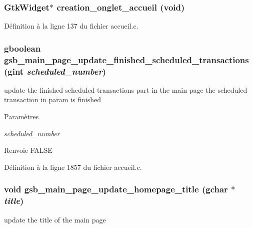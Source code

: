 \subsubsection[{creation\_\-onglet\_\-accueil}]{\setlength{\rightskip}{0pt plus 5cm}GtkWidget$\ast$ creation\_\-onglet\_\-accueil (void)}\label{accueil_8c_a31cb1d27d08c170361e63a0a7ef4ddb0}


Définition à la ligne 137 du fichier accueil.c.

\subsubsection[{gsb\_\-main\_\-page\_\-update\_\-finished\_\-scheduled\_\-transactions}]{\setlength{\rightskip}{0pt plus 5cm}gboolean gsb\_\-main\_\-page\_\-update\_\-finished\_\-scheduled\_\-transactions (gint {\em scheduled\_\-number})}\label{accueil_8c_a3b20e859b5870632529db167d03decfa}
update the finished scheduled transactions part in the main page the scheduled transaction in param is finished


\begin{DoxyParams}{Paramètres}
\item[{\em scheduled\_\-number}]\end{DoxyParams}
\begin{DoxyReturn}{Renvoie}
FALSE 
\end{DoxyReturn}


Définition à la ligne 1857 du fichier accueil.c.

\subsubsection[{gsb\_\-main\_\-page\_\-update\_\-homepage\_\-title}]{\setlength{\rightskip}{0pt plus 5cm}void gsb\_\-main\_\-page\_\-update\_\-homepage\_\-title (gchar $\ast$ {\em title})}\label{accueil_8c_a464c456279ac03bc59b1f54ae2133bf1}
update the title of the main page 

